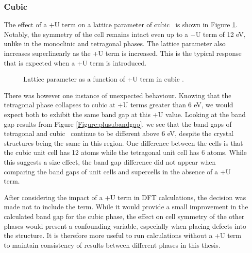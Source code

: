 \subsubsection{Cubic}

The effect of a +U term on a lattice parameter of cubic \zirconia\ is shown in Figure \ref{Figure:plusucubic}. Notably, the symmetry of the cell remains intact even up to a +U term of 12 eV, unlike in the monoclinic and tetragonal phases. The lattice parameter also increases superlinearly as the +U term is increased. This is the typical response that is expected when a +U term is introduced. 

\begin{figure}[ht] %
\begin{center}
		\caption{Lattice parameter as a function of +U term in cubic \zirconia .}
		\label{Figure:plusucubic}
	\end{center}
\end{figure}

There was however one instance of unexpected behaviour. Knowing that the tetragonal phase collapses to cubic at +U terms greater than 6 eV, we would expect both to exhibit the same band gap at this +U value. Looking at the band gap results from Figure \ref{Figure:plusubandgap}, we see that the band gaps of tetragonal and cubic \zirconia\ continue to be different above 6 eV, despite the crystal structures being the same in this region. One difference between the cells is that the cubic unit cell has 12 atoms while the tetragonal unit cell has 6 atoms. While this suggests a size effect, the band gap difference did not appear when comparing the band gaps of unit cells and supercells in the absence of a +U term. 

After considering the impact of a +U term in DFT calculations, the decision was made not to include the term. While it would provide a small improvement in the calculated band gap for the cubic phase, the effect on cell symmetry of the other phases would present a confounding variable, especially when placing defects into the structure. It is therefore more useful to run calculations without a +U term to maintain consistency of results between different phases in this thesis.